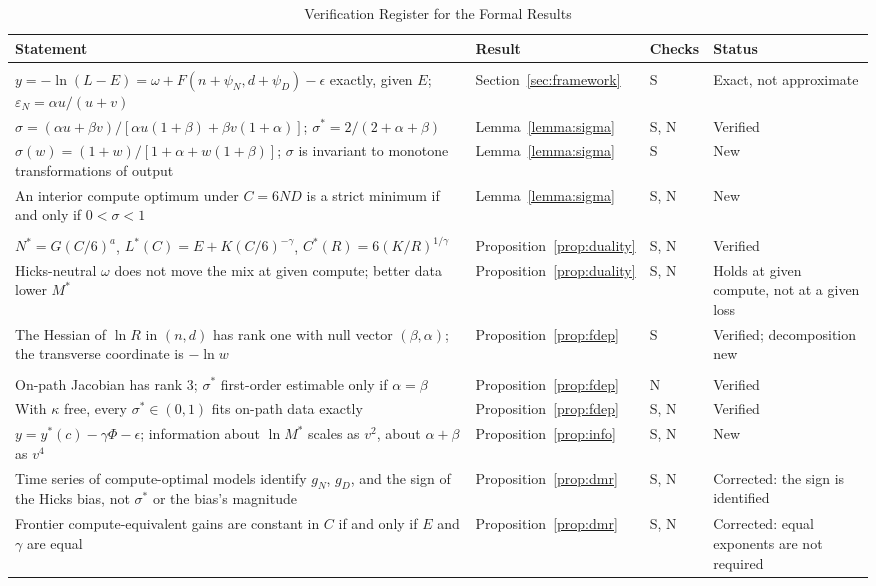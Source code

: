 \begin{table}[tp]
\centering
\caption{Verification Register for the Formal Results}
\label{tab:app-claims}
\footnotesize
\setlength{\tabcolsep}{3pt}
\renewcommand{\arraystretch}{1.0}
\begin{tabular}{@{}>{\raggedright\arraybackslash}p{}>{\raggedright\arraybackslash}p{}>{\raggedright\arraybackslash}p{}>{\raggedright\arraybackslash}p{}@{}}
\toprule
Statement & Result & Checks & Status \\
\midrule
\multicolumn{4}{@{}l}{\textit{Technology and elasticities}} \\
$y=-\ln(L-E)=\omega+F(n+\psi_N,d+\psi_D)-\epsilon$ exactly, given $E$; $\varepsilon_N=\alpha u/(u+v)$ & Section~\ref{sec:framework} & S & Exact, not approximate \\
$\sigma=(\alpha u+\beta v)/[\alpha u(1+\beta)+\beta v(1+\alpha)]$; $\sigma^*=2/(2+\alpha+\beta)$ & Lemma~\ref{lemma:sigma} & S, N & Verified \\
$\sigma(w)=(1+w)/[1+\alpha+w(1+\beta)]$; $\sigma$ is invariant to monotone transformations of output & Lemma~\ref{lemma:sigma} & S & New \\
An interior compute optimum under $C=6ND$ is a strict minimum if and only if $0<\sigma<1$ & Lemma~\ref{lemma:sigma} & S, N & New \\
\addlinespace
\multicolumn{4}{@{}l}{\textit{Duality, allocation, and geometry}} \\
$N^*=G(C/6)^a$, $L^*(C)=E+K(C/6)^{-\gamma}$, $C^*(R)=6(K/R)^{1/\gamma}$ & Proposition~\ref{prop:duality} & S, N & Verified \\
Hicks-neutral $\omega$ does not move the mix at given compute; better data lower $M^*$ & Proposition~\ref{prop:duality} & S, N & Holds at given compute, not at a given loss \\
The Hessian of $\ln R$ in $(n,d)$ has rank one with null vector $(\beta,\alpha)$; the transverse coordinate is $-\ln w$ & Proposition~\ref{prop:fdep} & S & Verified; decomposition new \\
\addlinespace
\multicolumn{4}{@{}l}{\textit{Identification}} \\
On-path Jacobian has rank 3; $\sigma^*$ first-order estimable only if $\alpha=\beta$ & Proposition~\ref{prop:fdep} & N & Verified \\
With $\kappa$ free, every $\sigma^*\in(0,1)$ fits on-path data exactly & Proposition~\ref{prop:fdep} & S, N & Verified \\
$y=y^*(c)-\gamma\Phi-\epsilon$; information about $\ln M^*$ scales as $v^2$, about $\alpha+\beta$ as $v^4$ & Proposition~\ref{prop:info} & S, N & New \\
Time series of compute-optimal models identify $g_N$, $g_D$, and the sign of the Hicks bias, not $\sigma^*$ or the bias's magnitude & Proposition~\ref{prop:dmr} & S, N & Corrected: the sign is identified \\
Frontier compute-equivalent gains are constant in $C$ if and only if $E$ and $\gamma$ are equal & Proposition~\ref{prop:dmr} & S, N & Corrected: equal exponents are not required \\


\end{tabular}
\end{table}
